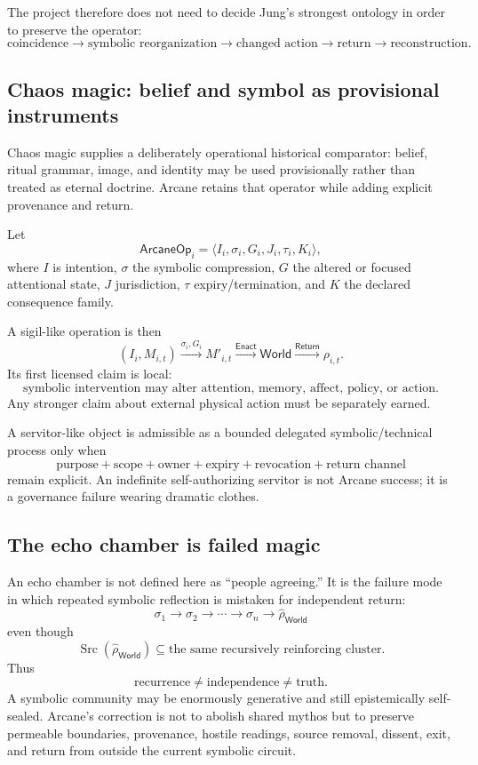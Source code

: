 \documentclass[11pt]{article}
\begin{document}
The project therefore does not need to decide Jung's strongest ontology in
order to preserve the operator:
\[
\text{coincidence}\to\text{symbolic reorganization}\to\text{changed action}
\to\text{return}\to\text{reconstruction}.
\]

\subsection{Chaos magic: belief and symbol as provisional instruments}

Chaos magic supplies a deliberately operational historical comparator: belief,
ritual grammar, image, and identity may be used provisionally rather than treated
as eternal doctrine. Arcane retains that operator while adding explicit
provenance and return.

Let
\[
\mathsf{ArcaneOp}_{i}=\langle I_i,\sigma_i,G_i,J_i,\tau_i,K_i\rangle,
\]
where $I$ is intention, $\sigma$ the symbolic compression, $G$ the altered or
focused attentional state, $J$ jurisdiction, $\tau$ expiry/termination, and $K$
the declared consequence family.

A sigil-like operation is then
\[
(I_i,M_{i,t})\xrightarrow{\sigma_i,G_i}M'_{i,t}
\xrightarrow{\mathsf{Enact}}\mathsf{World}
\xrightarrow{\mathsf{Return}}\rho_{i,t}.
\]
Its first licensed claim is local:
\[
\boxed{\text{symbolic intervention may alter attention, memory, affect, policy, or action}.}
\]
Any stronger claim about external physical action must be separately earned.

A servitor-like object is admissible as a bounded delegated symbolic/technical
process only when
\[
\boxed{\text{purpose}+\text{scope}+\text{owner}+\text{expiry}
+\text{revocation}+\text{return channel}}
\]
remain explicit. An indefinite self-authorizing servitor is not Arcane success;
it is a governance failure wearing dramatic clothes.

\subsection{The echo chamber is failed magic}

An echo chamber is not defined here as ``people agreeing.'' It is the failure
mode in which repeated symbolic reflection is mistaken for independent return:
\[
\sigma_1\to\sigma_2\to\cdots\to\sigma_n\to
\widehat{\rho}_{\mathsf{World}}
\]
even though
\[
\operatorname{Src}(\widehat{\rho}_{\mathsf{World}})
\subseteq\text{the same recursively reinforcing cluster}.
\]
Thus
\[
\boxed{\text{recurrence}\neq\text{independence}\neq\text{truth}.}
\]
A symbolic community may be enormously generative and still epistemically
self-sealed. Arcane's correction is not to abolish shared mythos but to preserve
permeable boundaries, provenance, hostile readings, source removal, dissent,
exit, and return from outside the current symbolic circuit.
\end{document}
